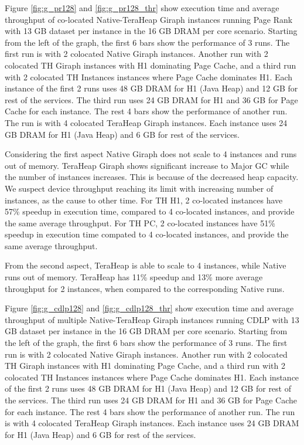 Figure \ref{fig:g_pr128} and \ref{fig:g_pr128_thr} show execution time and average throughput of co-located
Native-TeraHeap Giraph instances running Page Rank with 13 GB
dataset per instance in the 16 GB DRAM per core scenario.
Starting from the left of the graph, the first 6 bars show the
performance of 3 runs. The first run is with 2 colocated Native Giraph instances.
Another run with 2 colocated TH Giraph instances with H1 dominating Page Cache,
and a third run with 2 colocated TH Instances instances where Page Cache dominates H1.
Each instance of the first 2 runs uses 48 GB DRAM for H1 (Java Heap) and 12 GB for rest of the services.
The third run uses 24 GB DRAM for H1 and 36 GB for Page Cache for each instance.
The rest 4 bars show the performance of another run. The run is with 4 colocated TeraHeap Giraph instances.
Each instance uses 24 GB DRAM for H1 (Java Heap) and 6 GB for rest of the services.


Considering the first aspect Native Giraph does not scale to 4 instances and runs out of memory. TeraHeap Giraph shows significant increase to Major GC while the number of instances increases. This is because of the decreased heap capacity. We suspect device throughput reaching its limit with increasing number of instances, as the cause to other time. For TH H1, 2 co-located instances have 57\% speedup in execution time, compared to 4 co-located instances, and provide the same average throughput. For TH PC, 2 co-located instances have 51\% speedup in execution time compated to 4 co-located instances, and provide the same average throughput.

From the second aspect, TeraHeap is able to scale to 4 instances, while Native runs out of memory. TeraHeap has 11\% speedup and 13\% more average throughput for 2 instances, when compared to the corresponding Native runs.

Figure \ref{fig:g_cdlp128} and \ref{fig:g_cdlp128_thr} show execution time and average throughput of multiple
Native-TeraHeap Giraph instances running CDLP with 13 GB
dataset per instance in the 16 GB DRAM per core scenario.
Starting from the left of the graph, the first 6 bars show the
performance of 3 runs. The first run is with 2 colocated Native Giraph instances.
Another run with 2 colocated TH Giraph instances with H1 dominating Page Cache,
and a third run with 2 colocated TH Instances instances where Page Cache dominates H1.
Each instance of the first 2 runs uses 48 GB DRAM for H1 (Java Heap) and 12 GB for rest of the services.
The third run uses 24 GB DRAM for H1 and 36 GB for Page Cache for each instance.
The rest 4 bars show the performance of another run. The run is with 4 colocated TeraHeap Giraph instances.
Each instance uses 24 GB DRAM for H1 (Java Heap) and 6 GB for rest of the services.

